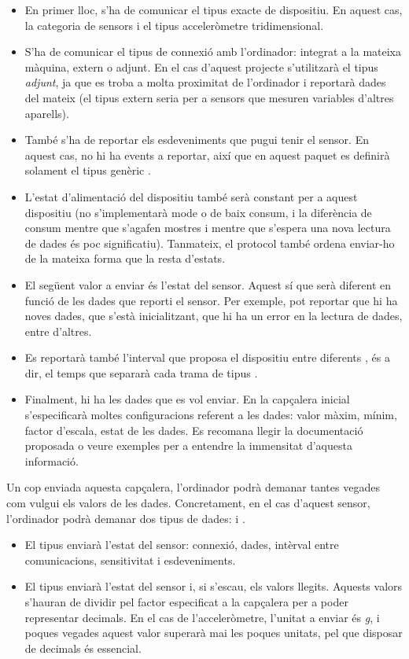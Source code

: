 \begin{itemize}
    \item En primer lloc, s'ha de comunicar el tipus exacte de dispositiu. En
    aquest cas, la categoria de sensors i el tipus acceleròmetre tridimensional.
    \item S'ha de comunicar el tipus de connexió amb l'ordinador: integrat a
    la mateixa màquina, extern o adjunt. En el cas d'aquest projecte s'utilitzarà
    el tipus \textit{adjunt}, ja que es troba a molta proximitat de l'ordinador
    i reportarà dades del mateix (el tipus extern seria per a sensors que
    mesuren variables d'altres aparells).
    \item També s'ha de reportar els esdeveniments que pugui tenir el sensor.
    En aquest cas, no hi ha events a reportar, així que en aquest paquet
    es definirà solament el tipus genèric .
    \item L'estat d'alimentació del dispositiu també serà constant per a
    aquest dispositiu (no s'implementarà mode  o de baix consum, i
    la diferència de consum mentre que s'agafen mostres i mentre que
    s'espera una nova lectura de dades és poc significatiu). Tanmateix, el
    protocol també ordena enviar-ho de la mateixa forma que la resta d'estats.
    \item El següent valor a enviar és l'estat del sensor. Aquest sí que serà
    diferent en funció de les dades que reporti el sensor. Per exemple, pot
    reportar que hi ha noves dades, que s'està inicialitzant, que hi ha un
    error en la lectura de dades, entre d'altres.
    \item Es reportarà també l'interval que proposa el dispositiu entre
    diferents , és a dir, el temps que separarà cada trama de
    tipus .
    \item Finalment, hi ha les dades que es vol enviar. En la capçalera inicial
    s'especificarà moltes configuracions referent a les dades: valor màxim,
    mínim, factor d'escala, estat de les dades. Es recomana llegir la
    documentació proposada o veure exemples per a entendre la immensitat
    d'aquesta informació.
\end{itemize}

Un cop enviada aquesta capçalera,
l'ordinador podrà demanar tantes vegades com vulgui els valors de les dades.
Concretament, en el cas d'aquest sensor, l'ordinador podrà demanar dos tipus
de dades:  i .

\begin{itemize}
    \item El tipus  enviarà l'estat del sensor: connexió, dades,
    intèrval entre comunicacions, sensitivitat i esdeveniments.
    \item El tipus  enviarà l'estat del sensor i, si s'escau, els
    valors llegits. Aquests valors s'hauran de dividir pel factor especificat
    a la capçalera per a poder representar decimals. En el cas de l'acceleròmetre,
    l'unitat a enviar és \textit{g}, i poques vegades aquest valor superarà mai
    les poques unitats, pel que disposar de decimals és essencial.
\end{itemize}

